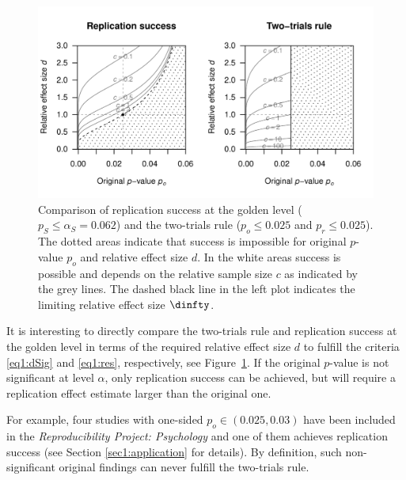 \begin{figure}[!h]
\centering
\begin{knitrout}
\color{fgcolor}

{\centering \includegraphics[width=\maxwidth]{images/paper1/fig2-1}

}


\end{knitrout}
\caption{Comparison of replication success at the golden level
  ($p_S \leq \alpha_S = 0.062$) and the two-trials rule ($p_o \leq 0.025$ and
  $p_r \leq 0.025$). The dotted areas indicate that success is impossible for
  original $p$-value $p_o$ and relative effect size $d$. In the white areas
  success is possible and depends on the relative sample size $c$ as indicated
  by the grey lines. The dashed black line in the left plot indicates the
  limiting relative effect size $\dinfty$. }
\label{fig1:fig2}
\end{figure}



It is interesting to directly compare the two-trials rule and replication
success at the golden level in terms of the required relative effect size $d$ to
fulfill the criteria \eqref{eq1:dSig} and \eqref{eq1:res}, respectively, see
Figure~\ref{fig1:fig2}. If the original $p$-value is not significant at level
$\alpha$, only replication success can be achieved, but will require a
replication effect estimate larger than the original one.

For example, four studies with one-sided $p_o \in (0.025, 0.03)$ have been
included in the \textit{Reproducibility Project: Psychology} \citep{Opensc2015}
and one of them achieves replication success (see Section \ref{sec1:application}
for details). By definition, such non-significant original findings can never
fulfill the two-trials rule.

